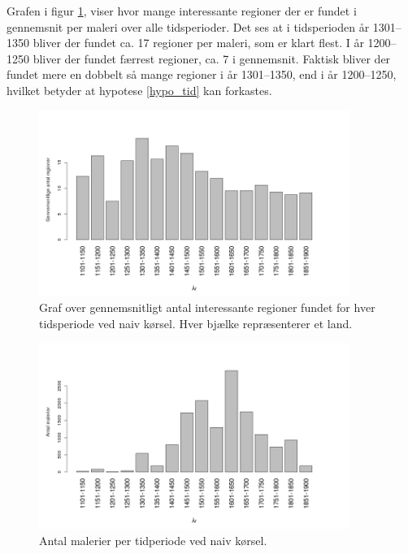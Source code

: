{Grafen i figur \ref{naiv_year}, viser hvor mange interessante regioner
der er fundet i gennemsnit per maleri over alle tidsperioder. Det ses at
i tidsperioden år 1301--1350 bliver der fundet ca. 17 regioner per
maleri, som er klart flest. I år 1200--1250 bliver der fundet færrest
regioner, ca. 7 i gennemsnit. Faktisk bliver der fundet mere en dobbelt
så mange regioner i år 1301--1350, end i år 1200--1250, hvilket betyder
at hypotese \ref{hypo_tid} kan forkastes.

\begin{figure}[!h]
	\centering
	\includegraphics[angle=0,width=0.90\textwidth]{afsnit/resultater/billeder/yearcut.png}
    \caption{Graf over gennemsnitligt antal interessante regioner fundet
    for hver tidsperiode ved naiv kørsel. Hver bjælke repræsenterer et
    land.}
	\label{naiv_year}
\end{figure}

\begin{figure}[!h]
	\centering
	\includegraphics[angle=0,width=0.90\textwidth]{afsnit/resultater/billeder/yearNrImage.png}
	\caption{Antal malerier per tidperiode ved naiv kørsel.}
	\label{naiv_yearNrImage}
\end{figure}

}
